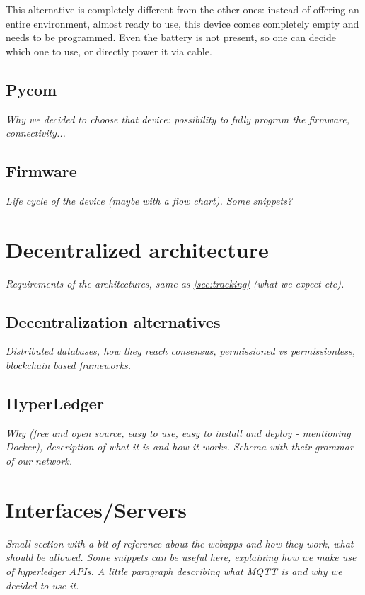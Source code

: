 This alternative is completely different from the other ones: instead of offering an entire environment, almost ready to use, this device comes completely empty and needs to be programmed. Even the battery is not present, so one can decide which one to use, or directly power it via cable.

\subsection{Pycom}
\label{sec:track_choice}
\textit{Why we decided to choose that device: possibility to fully program the firmware, connectivity...}

\subsection{Firmware}
\label{sec:track_firmware}
\textit{Life cycle of the device (maybe with a flow chart). Some snippets?}

\section{Decentralized architecture}
\label{sec:arch}
\textit{Requirements of the architectures, same as \ref{sec:tracking} (what we expect etc).}

\subsection{Decentralization alternatives}
\label{sec:alternatives}
\textit{Distributed databases, how they reach consensus, permissioned vs permissionless, blockchain based frameworks.}

\subsection{HyperLedger}
\label{sec:hyperledger}
\textit{Why (free and open source, easy to use, easy to install and deploy - mentioning Docker), description of what it is and how it works. Schema with their grammar of our network.}


\section{Interfaces/Servers}
\textit{Small section with a bit of reference about the webapps and how they work, what should be allowed. Some snippets can be useful here, explaining how we make use of hyperledger APIs. A little paragraph describing what MQTT is and why we decided to use it.}

